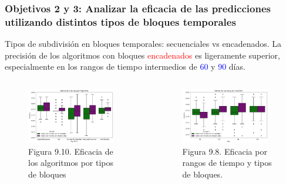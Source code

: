 \documentclass{beamer}
\begin{document}
\begin{frame}
	\frametitle{Objetivos 2 y 3: Analizar la eficacia de las predicciones utilizando distintos tipos de bloques temporales}
	\begin{block}{Tipos de subdivisión en bloques temporales: secuenciales vs encadenados.}
		La precisión de los algoritmos con bloques \textcolor{red}{encadenados} es ligeramente superior, especialmente en los rangos de tiempo intermedios de \textcolor{blue}{60} y \textcolor{blue}{90} días.
	\end{block}
	
	
	\begin{columns}[c]
		\begin{column}{.5\textwidth}
			\begin{figure}
				\centering
				\includegraphics[width=0.9\textwidth]{figs/cap7/figura_24}
				\caption{Figura 9.10. Eficacia de los algoritmos por tipos de bloques}
			\end{figure}      
		\end{column}
		\begin{column}{.5\textwidth}
			\begin{figure}
				\centering
				\includegraphics[width=0.9\textwidth]{figs/cap7/figura_6}
				\caption{Figura 9.8. Eficacia por rangos de tiempo y tipos de bloques.}
			\end{figure}
		\end{column}
	\end{columns}
	
\end{frame}
\end{document}
